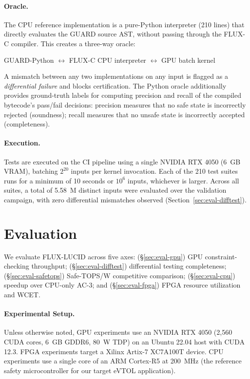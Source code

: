 \documentclass[sigplan,review,anonymous]{acmart}
\begin{document}
\paragraph{Oracle.}
The CPU reference implementation is a pure-Python interpreter (210 lines)
that directly evaluates the GUARD source AST, without passing through the
FLUX-C compiler. This creates a three-way oracle:

\begin{center}
GUARD-Python $\longleftrightarrow$ FLUX-C CPU interpreter
$\longleftrightarrow$ GPU batch kernel
\end{center}

A mismatch between any two implementations on any input is flagged as a
\emph{differential failure} and blocks certification.
The Python oracle additionally provides ground-truth labels for computing
precision and recall of the compiled bytecode's pass/fail decisions:
precision measures that no safe state is incorrectly rejected
(soundness); recall measures that no unsafe state is incorrectly accepted
(completeness).

\paragraph{Execution.}
Tests are executed on the CI pipeline using a single NVIDIA RTX 4050
(6~GB VRAM), batching $2^{20}$ inputs per kernel invocation.
Each of the 210 test suites runs for a minimum of 10 seconds or
$10^6$ inputs, whichever is larger.
Across all suites, a total of 5.58~M distinct inputs were evaluated over
the validation campaign, with zero differential mismatches observed
(Section~\ref{sec:eval-difftest}).

\section{Evaluation}
\label{sec:evaluation}

We evaluate FLUX-LUCID across five axes:
(§\ref{sec:eval-gpu}) GPU constraint-checking throughput;
(§\ref{sec:eval-difftest}) differential testing completeness;
(§\ref{sec:eval-safetops}) Safe-TOPS/W competitive comparison;
(§\ref{sec:eval-cpu}) speedup over CPU-only AC-3;
and (§\ref{sec:eval-fpga}) FPGA resource utilization and WCET.

\paragraph{Experimental Setup.}
Unless otherwise noted, GPU experiments use an NVIDIA RTX 4050 (2,560 CUDA
cores, 6~GB GDDR6, 80~W TDP) on an Ubuntu 22.04 host with CUDA 12.3.
FPGA experiments target a Xilinx Artix-7 XC7A100T device.
CPU experiments use a single core of an ARM Cortex-R5 at 200~MHz
(the reference safety microcontroller for our target eVTOL application).
\end{document}
